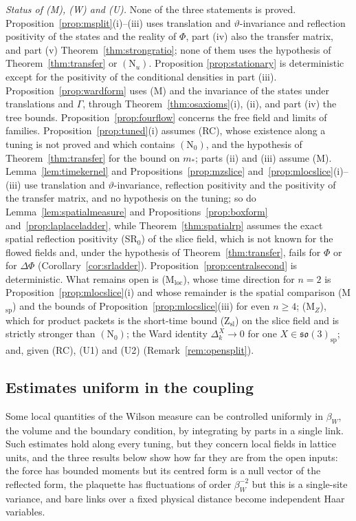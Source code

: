 \documentclass[aps,prd,twocolumn,superscriptaddress,nofootinbib,longbibliography,floatfix,amsmath,amssymb,10pt]{revtex4-2}
\theoremstyle{definition}
\theoremstyle{remark}
\begin{document}
\emph{Status of (M), (W) and (U).} None of the three statements is proved.
Proposition~\ref{prop:msplit}(i)--(iii) uses translation and
$\vartheta$-invariance and reflection positivity of the states and the
reality of $\Phi$, part (iv) also the transfer matrix, and part (v)
Theorem~\ref{thm:strongratio}; none of them uses the hypothesis of
Theorem~\ref{thm:transfer} or $(\mathrm N_u)$. Proposition
\ref{prop:stationary} is deterministic except for the positivity of the
conditional densities in part (iii). Proposition~\ref{prop:wardform} uses
(M) and the invariance of the states under translations and $\Gamma$,
through Theorem~\ref{thm:osaxioms}(i), (ii), and part (iv) the tree bounds.
Proposition~\ref{prop:fourflow} concerns the free field and limits of
families. Proposition~\ref{prop:tuned}(i) assumes (RC), whose existence
along a tuning is not proved and which contains $(\mathrm N_0)$, and the
hypothesis of Theorem~\ref{thm:transfer} for the bound on $m_*$; parts
(ii) and (iii) assume (M). Lemma~\ref{lem:timekernel} and
Propositions~\ref{prop:mzslice} and~\ref{prop:mlocslice}(i)--(iii) use
translation and $\vartheta$-invariance, reflection positivity and the
positivity of the transfer matrix, and no hypothesis on the tuning; so do
Lemma~\ref{lem:spatialmeasure} and Propositions~\ref{prop:boxform}
and~\ref{prop:laplaceladder}, while Theorem~\ref{thm:spatialrp} assumes
the exact spatial reflection positivity (SR$_0$) of the slice field, which
is not known for the flowed fields and, under the hypothesis of
Theorem~\ref{thm:transfer}, fails for $\Phi$ or for $\Delta\Phi$
(Corollary~\ref{cor:srladder}). Proposition~\ref{prop:centralsecond} is
deterministic. What
remains open is (M$_{\mathrm{loc}}$), whose time direction for $n=2$ is
Proposition~\ref{prop:mlocslice}(i) and whose remainder is the spatial
comparison (M$_{\mathrm{sp}}$) and the bounds of
Proposition~\ref{prop:mlocslice}(iii) for even $n\ge4$; (M$_Z$), which for
product packets is the short-time bound (Z$_{\mathrm{sl}}$) on the slice
field and is strictly stronger than $(\mathrm N_0)$; the Ward identity
$\Delta^X_k\to0$ for one $X\in\mathfrak{so}(3)_{\mathrm{sp}}$; and, given
(RC), (U1) and (U2) (Remark~\ref{rem:opensplit}).


\subsection{Estimates uniform in the coupling}\label{ssec:uniform}

Some local quantities of the Wilson measure can be controlled uniformly in
$\beta_W$, the volume and the boundary condition, by integrating by parts in a
single link. Such estimates hold along every tuning, but they concern local
fields in lattice units, and the three results below show how far they are
from the open inputs: the force has bounded moments but its centred form is a
null vector of the reflected form, the plaquette has fluctuations of order
$\beta_W^{-2}$ but this is a single-site variance, and bare links over a fixed
physical distance become independent Haar variables.
\end{document}
